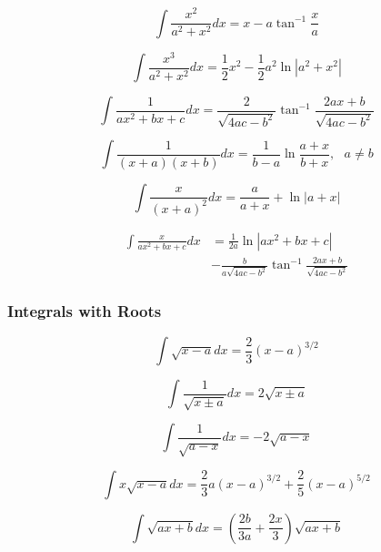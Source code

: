 \documentclass[11pt, letterpaper, notitlepage]{article}
\begin{document}
\begin{multicols}{2}
\begin{footnotesize}
\begin{equation}
\int \frac{x^2}{a^2+x^2}dx = x-a\tan^{-1}\frac{x}{a}
\end{equation}

\begin{equation}
\int \frac{x^3}{a^2+x^2}dx = \frac{1}{2}x^2-\frac{1}{2}a^2\ln|a^2+x^2|
\end{equation}

\begin{equation}
\int \frac{1}{ax^2+bx+c}dx = \frac{2}{\sqrt{4ac-b^2}}\tan^{-1}\frac{2ax+b}{\sqrt{4ac-b^2}}
\end{equation}

\begin{equation}
\int \frac{1}{(x+a)(x+b)}dx = \frac{1}{b-a}\ln\frac{a+x}{b+x}, \text{ } a\ne b
\end{equation}

\begin{equation}
\int \frac{x}{(x+a)^2}dx = \frac{a}{a+x}+\ln |a+x|
\end{equation}


\begin{align}
\int \frac{x}{ax^2+bx+c}dx &= \frac{1}{2a}\ln|ax^2+bx+c| \nonumber
\\&-\frac{b}{a\sqrt{4ac-b^2}}\tan^{-1}\frac{2ax+b}{\sqrt{4ac-b^2}}
\end{align}
\subsubsection{Integrals with Roots}

\begin{equation}
\int \sqrt{x-a} dx = \frac{2}{3}(x-a)^{3/2}
\end{equation}

\begin{equation}
\int \frac{1}{\sqrt{x\pm a}} dx = 2\sqrt{x\pm a} 
\end{equation}

\begin{equation}
\int \frac{1}{\sqrt{a-x}} dx = -2\sqrt{a-x} 
\end{equation}

\begin{equation}
\int x\sqrt{x-a} dx = \frac{2}{3}a(x-a)^{3/2}+\frac{2}{5}(x-a)^{5/2}
\end{equation}

\begin{equation}
\int \sqrt{ax+b}dx = \left(\frac{2b}{3a}+\frac{2x}{3}\right)\sqrt{ax+b}
\end{equation}


\end{footnotesize}
\end{multicols}
\end{document}
